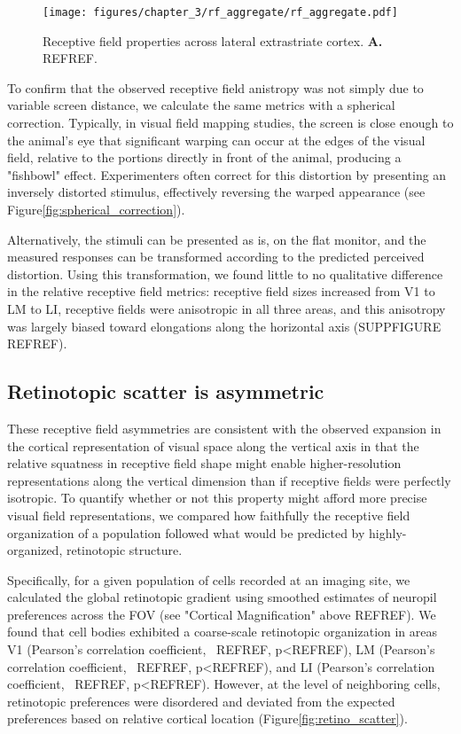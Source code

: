 \begin{figure}[t!]
    \texttt{[image: figures/chapter\_3/rf\_aggregate/rf\_aggregate.pdf]}
    \vspace{.1in}
    \caption[Receptive field properties]{Receptive field properties across lateral extrastriate cortex. \textbf{A.} REFREF.
    \label{fig:rf_examples}}
\end{figure}

To confirm that the observed receptive field anistropy was not simply due to variable screen distance, we calculate the same metrics with a spherical correction. Typically, in visual field mapping studies, the screen is close enough to the animal's eye that significant warping can occur at the edges of the visual field, relative to the portions directly in front of the animal, producing a "fishbowl" effect. Experimenters often correct for this distortion by presenting an inversely distorted stimulus, effectively reversing the warped appearance (see Figure\ref{fig:spherical_correction}). 

Alternatively, the stimuli can be presented as is, on the flat monitor, and the measured responses can be transformed according to the predicted perceived distortion. Using this transformation, we found little to no qualitative difference in the relative receptive field metrics: receptive field sizes increased from V1 to LM to LI, receptive fields were anisotropic in all three areas, and this anisotropy was largely biased toward elongations along the horizontal axis (SUPPFIGURE REFREF).

\subsection{Retinotopic scatter is asymmetric}
These receptive field asymmetries are consistent with the observed expansion in the cortical representation of visual space along the vertical axis in that the relative squatness in receptive field shape might enable higher-resolution representations along the vertical dimension than if receptive fields were perfectly isotropic. To quantify whether or not this property might afford more precise visual field representations, we compared how faithfully the receptive field organization of a population followed what would be predicted by highly-organized, retinotopic structure. 

Specifically, for a given population of cells recorded at an imaging site, we calculated the global retinotopic gradient using smoothed estimates of neuropil preferences across the FOV (see "Cortical Magnification" above REFREF). We found that cell bodies exhibited a coarse-scale retinotopic organization in areas V1 (Pearson's correlation coefficient, ~REFREF, p<REFREF), LM (Pearson's correlation coefficient, ~REFREF, p<REFREF), and LI (Pearson's correlation coefficient, ~REFREF, p<REFREF). However, at the level of neighboring cells, retinotopic preferences were disordered and deviated from the expected preferences based on relative cortical location (Figure\ref{fig:retino_scatter}).


